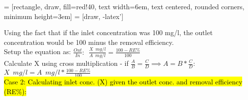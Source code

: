  = [rectangle, draw, fill=red!40, 
    text width=6em, text centered, rounded corners, minimum height=3em]
 = [draw, -latex']
\begin{figure}[!h]
\centering
{}
\end{figure}
Using the fact that if the inlet concentration was 100 mg/l, the outlet concentration would be 100 minus the removal efficiency.\\
Setup the equation as:  $\frac{Out}{In}: \enspace \frac{X \enspace mg/l}{A \enspace mg/l}=\frac{100-RE\%}{100}$\\
Calculate X using cross multiplication - if $\frac{A}{B}=\frac{C}{D} \implies A=B*\frac{C}{D}$:\\
$X \enspace mg/l=A \enspace mg/l*\frac{100-RE\%}{100}$\\


\hl{Case 2:  Calculating inlet conc. (X) given the outlet conc. and removal efficiency (RE\%):}

